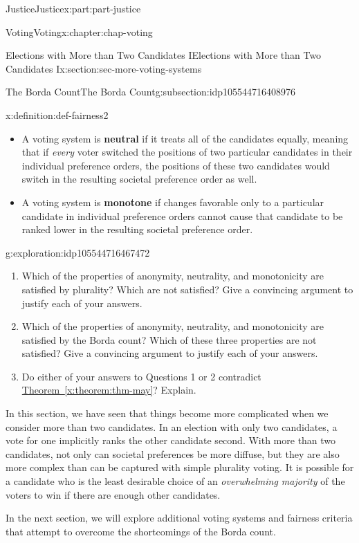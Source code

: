 \documentclass[oneside,10pt,]{book}
\newcommand{\xreffont}{\relax}
\newcommand{\terminology}[1]{\textbf{#1}}
\numberwithin{equation}{section}
\begin{document}
\begin{partptx}{Justice}{}{Justice}{}{}{x:part:part-justice}
\begin{chapterptx}{Voting}{}{Voting}{}{}{x:chapter:chap-voting}
\begin{sectionptx}{Elections with More than Two Candidates I}{}{Elections with More than Two Candidates I}{}{}{x:section:sec-more-voting-systems}
\begin{subsectionptx}{The Borda Count}{}{The Borda Count}{}{}{g:subsection:idp105544716408976}
\begin{definition}{}{x:definition:def-fairness2}
\begin{itemize}[label=\textbullet]
\item{}A voting system is \terminology{neutral} if it treats all of the candidates equally, meaning that if \emph{every} voter switched the positions of two particular candidates in their individual preference orders, the positions of these two candidates would switch in the resulting societal preference order as well.%
\item{}A voting system is \terminology{monotone} if changes favorable only to a particular candidate in individual preference orders cannot cause that candidate to be ranked lower in the resulting societal preference order.%
\end{itemize}
\end{definition}
\begin{exploration}{}{g:exploration:idp105544716467472}%
%
\begin{enumerate}
\item{}Which of the properties of anonymity, neutrality, and monotonicity are satisfied by plurality? Which are not satisfied? Give a convincing argument to justify each of your answers.%
\item{}Which of the properties of anonymity, neutrality, and monotonicity are satisfied by the Borda count? Which of these three properties are not satisfied? Give a convincing argument to justify each of your answers.%
\item{}Do either of your answers to Questions 1 or 2 contradict \hyperref[x:theorem:thm-may]{Theorem~{\xreffont\ref{x:theorem:thm-may}}}? Explain.%
\end{enumerate}
\end{exploration}%
\begin{conclusion}{}%
In this section, we have seen that things become more complicated when we consider more than two candidates. In an election with only two candidates, a vote for one implicitly ranks the other candidate second. With more than two candidates, not only can societal preferences be more diffuse, but they are also more complex than can be captured with simple plurality voting. It is possible for a candidate who is the least desirable choice of an \emph{overwhelming majority} of the voters to win if there are enough other candidates.%
\par
In the next section, we will explore additional voting systems and fairness criteria that attempt to overcome the shortcomings of the Borda count.%
\end{conclusion}%
\end{subsectionptx}
\end{sectionptx}

\end{chapterptx}
\end{partptx}
\end{document}
